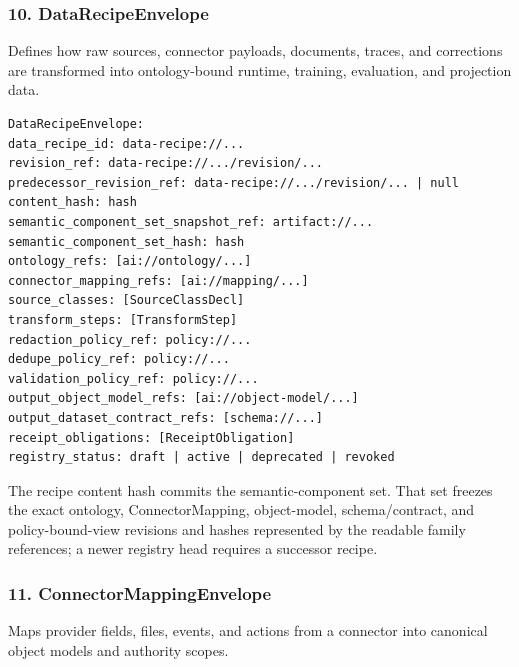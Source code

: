 \documentclass[
  11pt,
]{article}
\begin{document}
\hypertarget{datarecipeenvelope}{%
\subsubsection{10. DataRecipeEnvelope}\label{datarecipeenvelope}}

Defines how raw sources, connector payloads, documents, traces, and
corrections are transformed into ontology-bound runtime, training,
evaluation, and projection data.

\begin{lstlisting}[language={},basicstyle=\ttfamily\scriptsize]
DataRecipeEnvelope:
data_recipe_id: data-recipe://...
revision_ref: data-recipe://.../revision/...
predecessor_revision_ref: data-recipe://.../revision/... | null
content_hash: hash
semantic_component_set_snapshot_ref: artifact://...
semantic_component_set_hash: hash
ontology_refs: [ai://ontology/...]
connector_mapping_refs: [ai://mapping/...]
source_classes: [SourceClassDecl]
transform_steps: [TransformStep]
redaction_policy_ref: policy://...
dedupe_policy_ref: policy://...
validation_policy_ref: policy://...
output_object_model_refs: [ai://object-model/...]
output_dataset_contract_refs: [schema://...]
receipt_obligations: [ReceiptObligation]
registry_status: draft | active | deprecated | revoked
\end{lstlisting}
The recipe content hash commits the semantic-component set. That set freezes
the exact ontology, ConnectorMapping, object-model, schema/contract, and
policy-bound-view revisions and hashes represented by the readable family
references; a newer registry head requires a successor recipe.
\hypertarget{connectormappingenvelope}{%
\subsubsection{11.
ConnectorMappingEnvelope}\label{connectormappingenvelope}}

Maps provider fields, files, events, and actions from a connector into
canonical object models and authority scopes.
\end{document}
